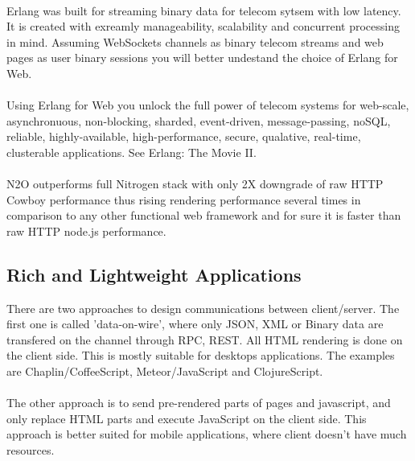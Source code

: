 
\newpage
\paragraph{}
Erlang was built for streaming binary data for telecom sytsem with
low latency. It is created with exreamly manageability, scalability
and concurrent processing in mind. Assuming WebSockets channels as binary
telecom streams and web pages as user binary sessions
you will better undestand the choice of Erlang for Web.

\paragraph{}
Using Erlang for Web you unlock the full power of telecom systems for
web-scale, asynchronuous, non-blocking, sharded, event-driven,
message-passing, noSQL, reliable, highly-available, high-performance,
secure, qualative, real-time, clusterable applications. See Erlang: The Movie II.

\paragraph{}
N2O outperforms full Nitrogen stack with only 2X downgrade of raw
HTTP Cowboy performance thus rising rendering performance several
times in comparison to any other functional web framework and for
sure it is faster than raw HTTP node.js performance.

\subsection*{Rich and Lightweight Applications}
There are two approaches to design communications between client/server.
The first one is called 'data-on-wire', where only JSON, XML or Binary
data are transfered on the channel through RPC, REST. All HTML rendering
is done on the client side. This is mostly suitable for desktops
applications. The examples are Chaplin/CoffeeScript, Meteor/JavaScript
and ClojureScript.

\paragraph{}
The other approach is to send pre-rendered parts of pages and javascript,
and only replace HTML parts and execute JavaScript on the client side. This approach
is better suited for mobile applications, where client doesn't have much resources.

